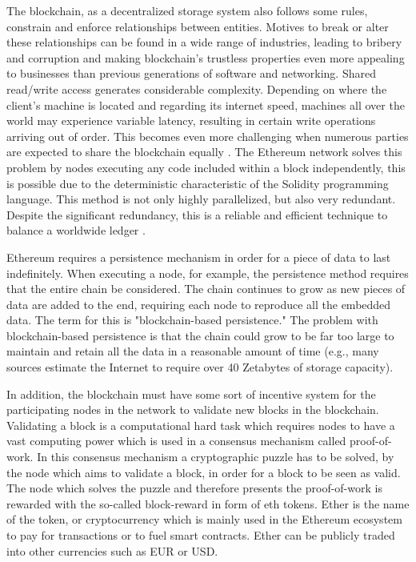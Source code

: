 The blockchain, as a decentralized storage system also follows some rules, constrain and enforce relationships between entities. Motives to break or alter these relationships can be found in a wide range of industries, leading to bribery and corruption and making blockchain's trustless properties even more appealing to businesses than previous generations of software and networking. Shared read/write access generates considerable complexity. Depending on where the client's machine is located and regarding its internet speed, machines all over the world may experience variable latency, resulting in certain write operations arriving out of order. This becomes even more challenging when numerous parties are expected to share the blockchain equally \cite[20]{dannen2017introducing}. The Ethereum network solves this problem by nodes executing any code included within a block independently, this is possible due to the deterministic characteristic of the Solidity programming language. This method is not only highly parallelized, but also very redundant. Despite the significant redundancy, this is a reliable and efficient technique to balance a worldwide ledger \cite[50]{dannen2017introducing}.

Ethereum requires a persistence mechanism in order for a piece of data to last indefinitely. When executing a node, for example, the persistence method requires that the entire chain be considered. The chain continues to grow as new pieces of data are added to the end, requiring each node to reproduce all the embedded data. The term for this is "blockchain-based persistence." The problem with blockchain-based persistence is that the chain could grow to be far too large to maintain and retain all the data in a reasonable amount of time (e.g., many sources estimate the Internet to require over 40 Zetabytes of storage capacity). 

In addition, the blockchain must have some sort of incentive system for the participating nodes in the network to validate new blocks in the blockchain. Validating a block is a computational hard task which requires nodes to have a vast computing power which is used in a consensus mechanism called proof-of-work. In this consensus mechanism a cryptographic puzzle has to be solved, by the node which aims to validate a block, in order for a block to be seen as valid. The node which solves the puzzle and therefore presents the proof-of-work is rewarded with the so-called block-reward in form of \acrlong{eth} tokens. Ether is the name of the token, or cryptocurrency which is mainly used in the Ethereum ecosystem to pay for transactions or to fuel smart contracts. Ether can be publicly traded into other currencies such as EUR or USD.

